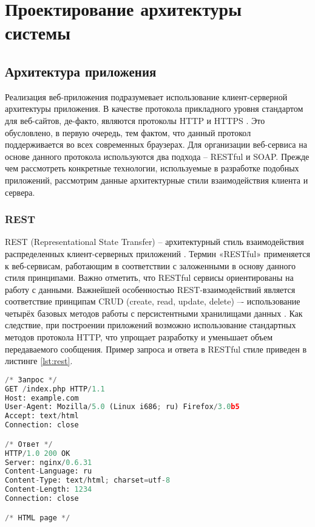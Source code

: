 \chapter{Проектирование архитектуры системы}

\section{Архитектура приложения}

Реализация веб-приложения подразумевает использование клиент-серверной архитектуры приложения. В качестве протокола прикладного уровня стандартом для веб-сайтов, де-факто, являются протоколы HTTP \cite{http} и HTTPS \cite{https}. Это обусловлено, в первую очередь, тем фактом, что данный протокол поддерживается во всех современных браузерах. Для организации веб-сервиса на основе данного протокола используются два подхода – RESTful и SOAP. Прежде чем рассмотреть конкретные технологии, используемые в разработке подобных приложений, рассмотрим данные архитектурные стили взаимодействия клиента и сервера. 

\subsection{REST}

REST (Representational State Transfer) – архитектурный стиль взаимодействия распределенных клиент-серверных приложений \cite{rest}. Термин «RESTful» применяется к веб-сервисам, работающим в соответствии с заложенными в основу данного стиля принципами. Важно отметить, что RESTful сервисы ориентированы на работу с данными. Важнейшей особенностью REST-взаимодействий является соответствие принципам CRUD (create, read, update, delete) –- использование четырёх базовых методов работы с персистентными хранилищами данных \cite{rest}. Как следствие, при построении приложений возможно использование стандартных методов протокола HTTP, что упрощает разработку и уменьшает объем передаваемого сообщения. Пример запроса и ответа в RESTful стиле приведен в листинге \ref{lst:rest}.

\begin{lstlisting}[language=Python, 
label=lst:rest, 
caption={Пример запроса и ответа в RESTful стиле.}]
/* Запрос */
GET /index.php HTTP/1.1
Host: example.com
User-Agent: Mozilla/5.0 (Linux i686; ru) Firefox/3.0b5
Accept: text/html
Connection: close

/* Ответ */
HTTP/1.0 200 OK
Server: nginx/0.6.31
Content-Language: ru
Content-Type: text/html; charset=utf-8
Content-Length: 1234
Connection: close

/* HTML page */
\end{lstlisting}

